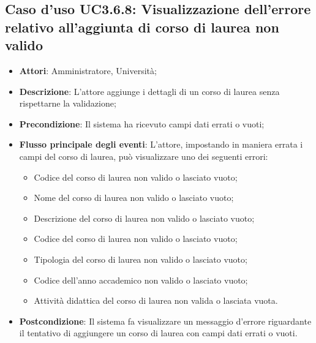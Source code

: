 \subsection{Caso d'uso \texorpdfstring{UC3.6.8}{UC3.6.8}: Visualizzazione dell'errore relativo all’aggiunta di corso di laurea non valido }
\begin{itemize}
\item \textbf{Attori}: Amministratore, Università;
\item \textbf{Descrizione}: L'attore aggiunge i dettagli di un corso di laurea senza rispettarne la validazione;

\item \textbf{Precondizione}: Il sistema ha ricevuto campi dati errati o vuoti;

\item \textbf{Flusso principale degli eventi}: L'attore, impostando in maniera errata i campi del corso di laurea, può visualizzare uno dei seguenti errori: \begin{itemize}
\item Codice del corso di laurea non valido o lasciato vuoto;
\item Nome del corso di laurea non valido o lasciato vuoto;
\item Descrizione del corso di laurea non valido o lasciato vuoto;
\item Codice del corso di laurea non valido o lasciato vuoto;
\item Tipologia del corso di laurea non valido o lasciato vuoto;
\item Codice dell'anno accademico non valido o lasciato vuoto;
\item Attività didattica del corso di laurea non valida o lasciata vuota.
\end{itemize}

\item \textbf{Postcondizione}: Il sistema fa visualizzare un messaggio d'errore riguardante il tentativo di aggiungere un corso di laurea con campi dati errati o vuoti.

\end{itemize}
